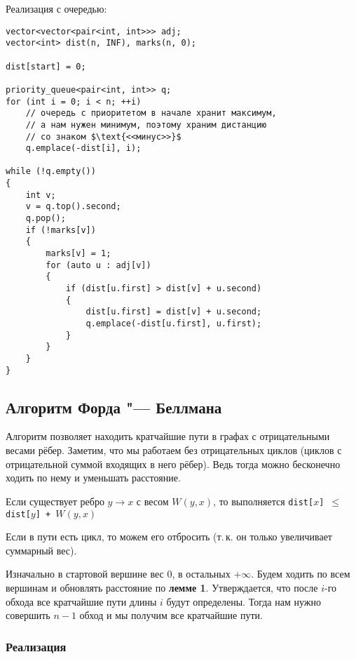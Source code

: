 Реализация с очередью:

\begin{verbatim}
vector<vector<pair<int, int>>> adj;
vector<int> dist(n, INF), marks(n, 0);

dist[start] = 0;

priority_queue<pair<int, int>> q;
for (int i = 0; i < n; ++i)
    // очередь с приоритетом в начале хранит максимум,
    // а нам нужен минимум, поэтому храним дистанцию
    // со знаком $\text{<<минус>>}$
    q.emplace(-dist[i], i);

while (!q.empty())
{
    int v;
    v = q.top().second;
    q.pop();
    if (!marks[v])
    {
        marks[v] = 1;
        for (auto u : adj[v])
        {
            if (dist[u.first] > dist[v] + u.second)
            {
                dist[u.first] = dist[v] + u.second;
                q.emplace(-dist[u.first], u.first);
            }
        }
    }
}
\end{verbatim}

\subsection{Алгоритм Форда "--- Беллмана}

Алгоритм позволяет находить кратчайшие пути в графах с отрицательными весами рёбер. Заметим, что мы работаем без отрицательных циклов (циклов с отрицательной суммой входящих в него рёбер). Ведь тогда можно бесконечно ходить по нему и уменьшать расстояние.

\begin{lemma} Если существует ребро $y \rightarrow x$ с весом $W(y, x)$, то выполняется
    \textnormal{\texttt{dist[$x$] $\leqslant$ dist[$y$] + $W(y, x)$}}
\end{lemma}

\begin{lemma}
    Если в пути есть цикл, то можем его отбросить (т.\,к. он только увеличивает суммарный вес).
\end{lemma}

Изначально в стартовой вершине вес $0$, в остальных $+\infty$. Будем ходить по всем вершинам и обновлять расстояние по \textbf{лемме 1}. Утверждается, что после $i$-го обхода все кратчайшие пути длины $i$ будут определены. Тогда нам нужно совершить $n-1$ обход и мы получим все кратчайшие пути.

\subsubsection{Реализация}

